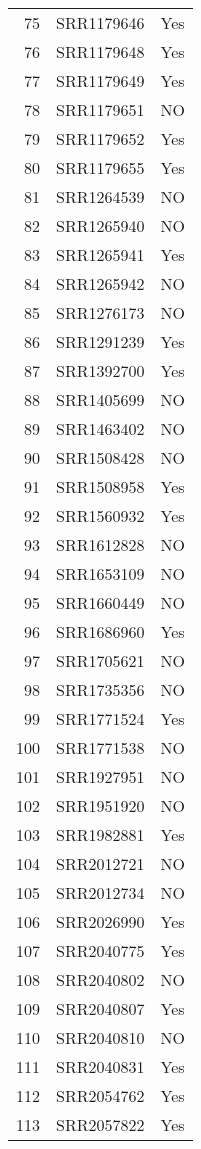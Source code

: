 \begin{table}[ht]
\begin{tabular}{rll}
  75 & SRR1179646 & Yes \\ 
  76 & SRR1179648 & Yes \\ 
  77 & SRR1179649 & Yes \\ 
  78 & SRR1179651 & NO \\ 
  79 & SRR1179652 & Yes \\ 
  80 & SRR1179655 & Yes \\ 
  81 & SRR1264539 & NO \\ 
  82 & SRR1265940 & NO \\ 
  83 & SRR1265941 & Yes \\ 
  84 & SRR1265942 & NO \\ 
  85 & SRR1276173 & NO \\ 
  86 & SRR1291239 & Yes \\ 
  87 & SRR1392700 & Yes \\ 
  88 & SRR1405699 & NO \\ 
  89 & SRR1463402 & NO \\ 
  90 & SRR1508428 & NO \\ 
  91 & SRR1508958 & Yes \\ 
  92 & SRR1560932 & Yes \\ 
  93 & SRR1612828 & NO \\ 
  94 & SRR1653109 & NO \\ 
  95 & SRR1660449 & NO \\ 
  96 & SRR1686960 & Yes \\ 
  97 & SRR1705621 & NO \\ 
  98 & SRR1735356 & NO \\ 
  99 & SRR1771524 & Yes \\ 
  100 & SRR1771538 & NO \\ 
  101 & SRR1927951 & NO \\ 
  102 & SRR1951920 & NO \\ 
  103 & SRR1982881 & Yes \\ 
  104 & SRR2012721 & NO \\ 
  105 & SRR2012734 & NO \\ 
  106 & SRR2026990 & Yes \\ 
  107 & SRR2040775 & Yes \\ 
  108 & SRR2040802 & NO \\ 
  109 & SRR2040807 & Yes \\ 
  110 & SRR2040810 & NO \\ 
  111 & SRR2040831 & Yes \\ 
  112 & SRR2054762 & Yes \\ 
  113 & SRR2057822 & Yes \\ 

\end{tabular}
\end{table}
